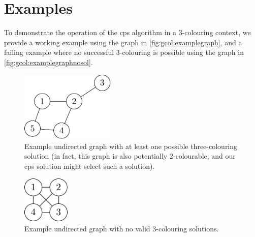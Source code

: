 \section{\label{sec:gcol:examples}Examples}

To demonstrate the operation of the \gls{cps} algorithm in a 3-colouring context, we provide a working example using the graph in \autoref{fig:gcol:examplegraph}, and a failing example where no successful 3-colouring is possible using the graph in \autoref{fig:gcol:examplegraphnosol}.

\begin{figure}
    \centering
    \includegraphics[width=0.4\textwidth]{chapters/gcol/figs/examplegraph1-figure2.pdf}
    \caption[Example undirected graph with at least one possible three-colouring solution]{Example undirected graph with at least one possible three-colouring solution (in fact, this graph is also potentially 2-colourable, and our \gls{cps} solution might select such a solution).}
    \label{fig:gcol:examplegraph}
\end{figure}

\begin{figure}
    \centering
    \includegraphics[width=0.2\textwidth]{chapters/gcol/figs/examplegraph1-figure3.pdf}
    \caption{Example undirected graph with no valid 3-colouring solutions.}
    \label{fig:gcol:examplegraphnosol}
\end{figure}

